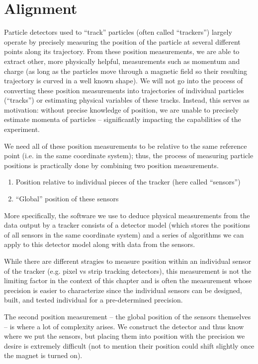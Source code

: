 \chapter{Alignment}
\label{chapter:hps:alignment}

Particle detectors used to ``track'' particles (often called ``trackers'')
largely operate by precisely measuring the position of the particle at several
different points along its trajectory.
From these position measurements, we are able to extract other,
more physically helpful, measurements such as momentum and charge
(as long as the particles move through a magnetic field so their resulting
trajectory is curved in a well known shape).
We will not go into the process of converting these position measurements
into trajectories of individual particles (``tracks'')
or estimating physical variables of these tracks.
Instead, this serves as motivation:
without precise knowledge of position, we are unable to precisely estimate
momenta of particles -- significantly impacting the capabilities of the
experiment.

We need all of these position measurements to be relative
to the same reference point (i.e. in the same coordinate system);
thus, the process of measuring particle positions is practically
done by combining two position measurements.
\begin{enumerate}
	\item Position relative to individual pieces of the tracker (here called ``sensors'')
	\item ``Global'' position of these sensors
\end{enumerate}
More specifically, the software we use to deduce physical measurements from the data
output by a tracker consists of a detector model (which stores the positions of all
sensors in the same coordinate system) and a series of algorithms we can apply to
this detector model along with data from the sensors.

While there are different stragies to measure position within
an individual sensor of the tracker (e.g. pixel vs strip tracking detectors),
this measurement is not the limiting factor in the context of this chapter
and is often the measurement whose precision is easier to characterize
since the individual sensors can be designed, built, and tested individual
for a pre-determined precision.

The second position measurement -- the global position of the sensors themselves
-- is where a lot of complexity arises.
We construct the detector and thus know where we put the sensors,
but placing them into position with the precision we desire is extremely difficult
(not to mention their position could shift slightly once the magnet is turned on).


